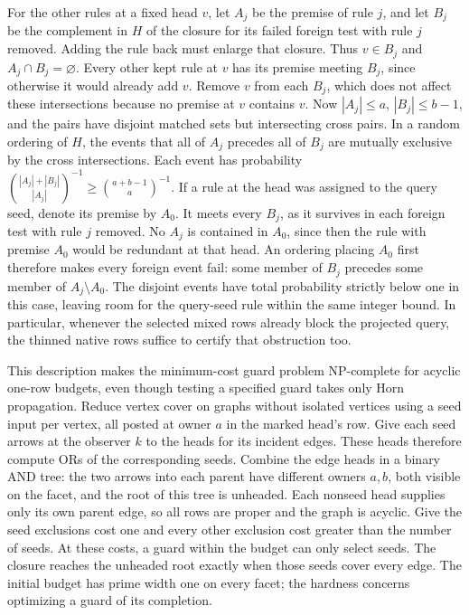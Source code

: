 For the other rules at a fixed head $v$, let $A_j$
be the premise of rule $j$, and let $B_j$ be the
complement in $H$ of the closure for its failed
foreign test with rule $j$ removed. Adding the
rule back must enlarge that closure. Thus $v\in B_j$
and $A_j\cap B_j=\varnothing$. Every other kept
rule at $v$ has its premise meeting $B_j$,
since otherwise it would already add $v$. Remove
$v$ from each $B_j$, which does not affect these
intersections because no premise at $v$ contains
$v$. Now $|A_j|\le a$, $|B_j|\le b-1$, and the
pairs have disjoint matched sets but intersecting
cross pairs. In a random ordering of $H$, the
events that all of $A_j$ precedes all of $B_j$
are mutually exclusive by the cross intersections.
Each event has probability
$\binom{|A_j|+|B_j|}{|A_j|}^{-1}
\ge\binom{a+b-1}{a}^{-1}$. If a rule at the head was
assigned to the query seed, denote its premise by
$A_0$. It meets every $B_j$, as it survives in each
foreign test with rule $j$ removed. No $A_j$ is
contained in $A_0$, since then the rule with premise
$A_0$ would be redundant at that head. An ordering
placing $A_0$ first therefore makes every foreign
event fail: some member of $B_j$ precedes some
member of $A_j\setminus A_0$. The disjoint events
have total probability strictly below one in this
case, leaving room for the query-seed rule within
the same integer bound. In particular, whenever the selected
mixed rows already block the projected query,
the thinned native rows suffice to certify that
obstruction too.

This description makes the minimum-cost guard
problem NP-complete for acyclic one-row budgets,
even though testing a specified guard takes only
Horn propagation. Reduce vertex cover on graphs
without isolated vertices using a seed input per
vertex, all posted at owner $a$
in the marked head's row. Give each seed arrows
at the observer $k$ to the heads for its incident
edges. These heads therefore compute ORs of the
corresponding seeds. Combine the edge heads in a
binary AND tree: the two arrows into each parent
have different owners $a,b$, both visible on
the facet, and the root of this tree is unheaded.
Each nonseed head supplies only its own parent
edge, so all rows are proper and the graph is
acyclic. Give the seed exclusions cost one and
every other exclusion cost greater than the
number of seeds. At these costs, a guard within
the budget can only select seeds. The closure
reaches the unheaded root exactly when those
seeds cover every edge. The initial budget has
prime width one on every facet; the hardness
concerns optimizing a guard of its completion.

